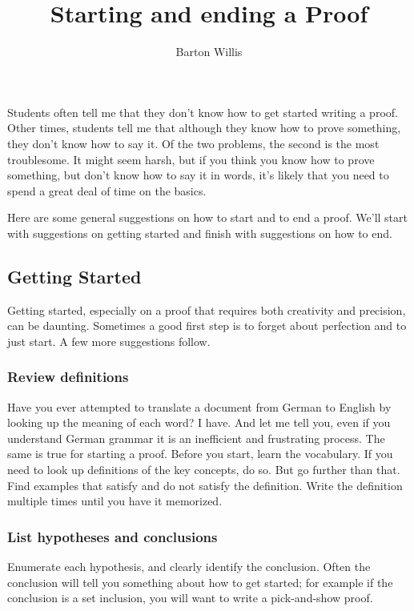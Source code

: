 \documentclass[12pt,fleqn]{article}
\title{Starting and ending a Proof}
\author{Barton Willis}
\newcounter{ex}\setcounter{ex}{0}
\newcounter{id}\setcounter{id}{0}
\newcounter{se}\setcounter{se}{0}
\begin{document}
\maketitle

Students often tell me that they don't know how to get started writing a proof. Other times, students tell me that although they know how to prove something, they don't know how to say it. Of the two problems, the second is the most troublesome. It
might seem harsh, but if you think you know how to prove something, but don't know how to say it in words, it's likely that 
you need to spend a great deal of time on the basics.

Here are some general suggestions on how to start and to end a proof. We'll start with suggestions on 
getting started and finish with suggestions on how to end.

\subsection{Getting Started}

Getting started, especially on a proof that requires both
creativity and precision, can be daunting.  Sometimes a good first step is to forget about 
perfection and to just start. A few more suggestions follow.

\subsubsection{Review definitions} 

Have you ever attempted to translate a 
document from German to English by looking up the meaning of each 
word? I have. And let me tell you, even if you understand German grammar
 it is an inefficient and frustrating process. The same is true
 for starting a proof. Before you start, learn the vocabulary. If you 
 need to look up definitions of the key concepts, do so. But go further than that. 
 Find examples that satisfy and do not satisfy the definition. Write the
 definition multiple times until you have it memorized.

 \subsubsection{List hypotheses and conclusions} 

 Enumerate each hypothesis, and clearly
 identify the conclusion.  Often the conclusion will tell you something about how
 to get started; for example if the conclusion is a set inclusion, you will want
 to write a pick-and-show proof.
\end{document}
